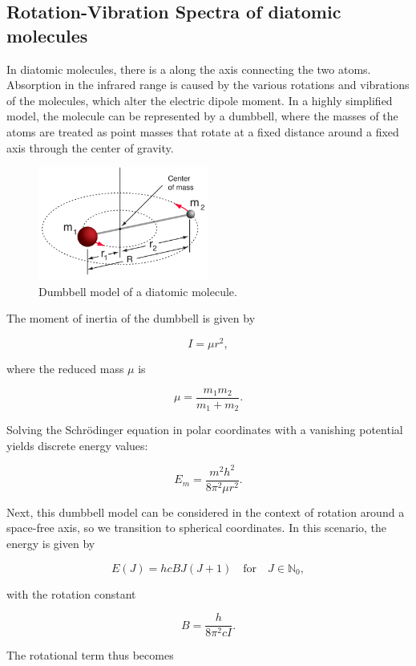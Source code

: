 \documentclass{article}
\begin{document}
\subsection{Rotation-Vibration Spectra of diatomic molecules}

In diatomic molecules, there is a along the axis connecting the two atoms. Absorption in the infrared range is caused by the various rotations and vibrations of the molecules, which alter the electric dipole moment. In a highly simplified model, the molecule can be represented by a dumbbell, where the masses of the atoms are treated as point masses that rotate at a fixed distance around a fixed axis through the center of gravity.

\begin{figure}[h]
	\centering
	\includegraphics[width=0.5\textwidth]{Figures/Introduction/Dumbbell.png}
	\caption{Dumbbell model of a diatomic molecule. \cite{nave_rotational}}
	\label{fig:dumbbell}
\end{figure}

The moment of inertia of the dumbbell is given by

\[
I = \mu r^2,
\]

where the reduced mass \(\mu\) is

\[
\mu = \frac{m_1 m_2}{m_1 + m_2}.
\]

Solving the Schrödinger equation in polar coordinates with a vanishing potential yields discrete energy values:

\[
E_m = \frac{m^2 h^2}{8 \pi^2 \mu r^2}.
\]

Next, this dumbbell model can be considered in the context of rotation around a space-free axis, so we transition to spherical coordinates. In this scenario, the energy is given by

\[
E(J) = hcBJ(J + 1) \quad \text{for} \quad J \in \mathbb{N}_0,
\]

with the rotation constant

\[
B = \frac{h}{8\pi^2cI}.
\]

The rotational term thus becomes
\end{document}
